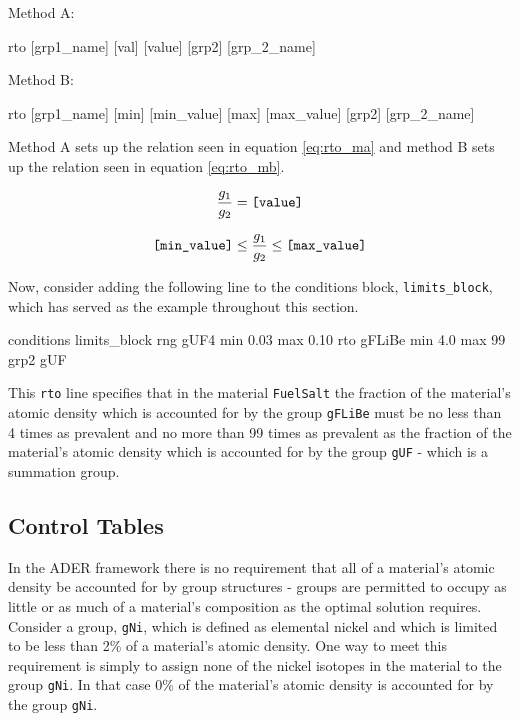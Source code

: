 \noindent Method A:
\begin{lt}
rto [grp1_name] [val] [value] [grp2] [grp_2_name]
\end{lt}

\noindent Method B:
\begin{lt}
rto [grp1_name] [min] [min_value] [max] [max_value] [grp2] [grp_2_name]
\end{lt}

Method A sets up the relation seen in
equation \ref{eq:rto_ma} and method B sets up the relation seen in equation
\ref{eq:rto_mb}.

\begin{equation}\label{eq:rto_ma}
\frac{g_{1}}{g_{2}} = \text{\texttt{[value]}}
\end{equation}

\begin{equation}\label{eq:rto_mb}
\text{\texttt{[min\_value]}} \leq \frac{g_{1}}{g_{2}} \leq \text{\texttt{[max\_value]}}
\end{equation}

Now, consider adding the following line to the conditions block,
\texttt{limits\_block}, which has served as the example throughout this section.

\begin{li}
conditions limits_block
rng gUF4    min 0.03    max 0.10
rto gFLiBe  min 4.0 max 99  grp2    gUF
\end{li}

This \texttt{rto} line specifies that in the material \texttt{FuelSalt} the
fraction of the material's atomic density which is accounted for by the
group \texttt{gFLiBe} must be no less than 4 times as prevalent and no more
than 99 times as prevalent as the fraction of the material's atomic density
which is accounted for by the group \texttt{gUF} - which is a summation group.

\subsection{Control Tables}\label{ssec:control}
In the ADER framework there is no requirement that all of a material's atomic
density be accounted for by group structures - groups are permitted to
occupy as little or as much of a material's composition as the optimal solution
requires. Consider a group, \texttt{gNi}, which is defined as elemental 
nickel and which is
limited to be less than 2\% of a material's atomic density. One way to meet this
requirement is simply to assign none of the nickel isotopes in the material to
the group \texttt{gNi}. In that case 0\% of the material's atomic density is
accounted for by the group \texttt{gNi}. 

